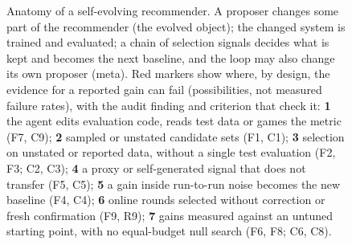 \begin{figure}[t]
\caption{Anatomy of a self-evolving recommender. A proposer changes some part of the recommender (the evolved object);
the changed system is trained and evaluated; a chain of selection signals decides what is kept and becomes the next
baseline, and the loop may also change its own proposer (meta). Red markers show where, by design, the evidence for a reported
gain can fail (possibilities, not measured failure rates), with the audit finding and criterion that check it:
\textbf{1} the agent edits evaluation code, reads test data or games the metric (F7, C9);
\textbf{2} sampled or unstated candidate sets (F1, C1);
\textbf{3} selection on unstated or reported data, without a single test evaluation (F2, F3; C2, C3);
\textbf{4} a proxy or self-generated signal that does not transfer (F5, C5);
\textbf{5} a gain inside run-to-run noise becomes the new baseline (F4, C4);
\textbf{6} online rounds selected without correction or fresh confirmation (F9, R9);
\textbf{7} gains measured against an untuned starting point, with no equal-budget null search (F6, F8; C6, C8).}
\label{fig:loop}
\end{figure}

